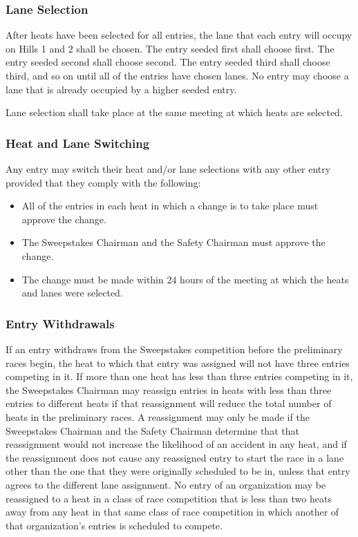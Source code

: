\subsubsection{Lane Selection}

	After heats have been selected for all entries, the lane that each entry will occupy on Hills 1 and 2 shall be chosen. The entry seeded first shall choose first. The entry seeded second shall choose second. The entry seeded third shall choose third, and so on until all of the entries have chosen lanes. No entry may choose a lane that is already occupied by a higher seeded entry.

	Lane selection shall take place at the same meeting at which heats are selected.

\subsubsection{Heat and Lane Switching}

	Any entry may switch their heat and/or lane selections with any other entry provided that they comply with the following:

	\begin{itemize}
		\item All of the entries in each heat in which a change is to take place must approve the change.
		\item The Sweepstakes Chairman and the Safety Chairman must approve the change.
		\item The change must be made within 24 hours of the meeting at which the heats and lanes were selected.
	\end{itemize}

\subsubsection{Entry Withdrawals}

	If an entry withdraws from the Sweepstakes competition before the preliminary races begin, the heat to which that entry was assigned will not have three entries competing in it. If more than one heat has less than three entries competing in it, the Sweepstakes Chairman may reassign entries in heats with less than three entries to different heats if that reassignment will reduce the total number of heats in the preliminary races. A reassignment may only be made if the Sweepstakes Chairman and the Safety Chairman determine that that reassignment would not increase the likelihood of an accident in any heat, and if the reassignment does not cause any reassigned entry to start the race in a lane other than the one that they were originally scheduled to be in, unless that entry agrees to the different lane assignment. No entry of an organization may be reassigned to a heat in a class of race competition that is less than two heats away from any heat in that same class of race competition in which another of that organization's entries is scheduled to compete.

